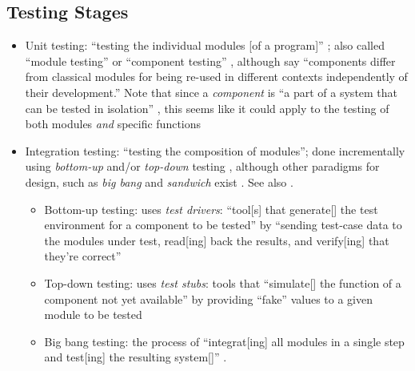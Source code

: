 \subsection{Testing Stages}
\begin{itemize}
      \item Unit testing: ``testing the individual modules [of a program]''
            \citep[p.~438]{vanVliet2000}; also called ``module testing''
            \citep[p.~109]{Patton2006} or ``component testing''
            \citep[p.~444]{PetersAndPedrycz2000}, although
            \citet[p.~107]{BaresiAndPezzè2006} say ``components differ from
            classical modules for being re-used in different contexts
            independently of their development.'' Note that since a
            \emph{component} is ``a part of a system that can be tested in
            isolation'' \citepISTQB{}, this seems like it could apply
            to the testing of both modules \emph{and} specific functions
      \item Integration testing: ``testing the composition of modules'';
            done incrementally using \emph{bottom-up} and/or
            \emph{top-down} testing \citep[pp.~438-439]{vanVliet2000},
            although other paradigms for design, such as \emph{big bang} and
            \emph{sandwich} exist \citep[p.~489]{PetersAndPedrycz2000}.
            See also \citep[p.~109]{Patton2006}.
            \begin{itemize}
                  \item Bottom-up testing: uses \emph{test drivers}: ``tool[s]
                        that generate[] the test environment for a component to
                        be tested'' \citep[p.~410]{vanVliet2000} by
                        ``sending test-case data to the modules under test,
                        read[ing] back the results, and verify[ing] that
                        they're correct'' \citep[p.~109]{Patton2006}
                  \item Top-down testing: uses \emph{test stubs}: tools that
                        ``simulate[] the function of a component not yet
                        available'' \citep[p.~410]{vanVliet2000} by
                        providing ``fake'' values to a given module to be
                        tested \citep[p.~110]{Patton2006}
                  \item Big bang testing: the process of ``integrat[ing] all
                        modules in a single step and test[ing] the resulting
                        system[]'' \citep[p.~489]{PetersAndPedrycz2000}.

\end{itemize}
\end{itemize}
